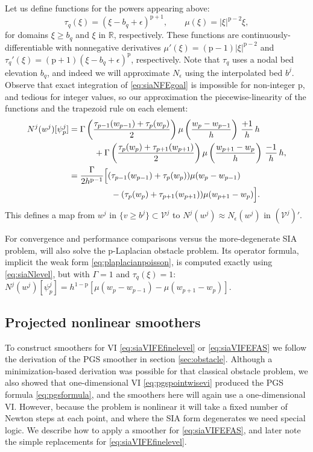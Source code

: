 \documentclass[letterpaper,final,12pt,reqno]{amsart}
\theoremstyle{claim}
\newcommand{\eps}{\epsilon}
\newcommand{\RR}{\mathbb{R}}
\newcommand{\pp}{{\text{p}}}
\numberwithin{equation}{section}
\numberwithin{figure}{section}
\numberwithin{table}{section}
\numberwithin{theorem}{section}
\begin{document}
Let us define functions for the powers appearing above:
\begin{equation}
\tau_q(\xi)  = (\xi - b_q + \eps)^{\pp+1}, \qquad \mu(\xi) = |\xi|^{\pp-2} \xi, \label{eq:siahelperfcns}
\end{equation}
for domains $\xi \ge b_q$ and $\xi$ in $\RR$, respectively.  These functions are continuously-differentiable with nonnegative derivatives $\mu'(\xi) = (\pp-1) |\xi|^{\pp-2}$ and $\tau_q'(\xi) = (\pp+1) (\xi-b_q + \eps)^{\pp}$, respectively.  Note that $\tau_q$ uses a nodal bed elevation $b_q$, and indeed we will approximate $N_\eps$ using the interpolated bed $b^j$.  Observe that exact integration of \eqref{eq:siaNFEgoal} is impossible for non-integer $\pp$, and tedious for integer values, so our approximation the piecewise-linearity of the functions and the trapezoid rule on each element:
\begin{align}
N^j(w^j)[\psi_p^j] &= \Gamma \left(\frac{\tau_{p-1}(w_{p-1}) + \tau_p(w_p)}{2}\right) \mu\left(\frac{w_p-w_{p-1}}{h}\right)\, \frac{+1}{h}\, h \notag \\
    &\qquad\quad  + \Gamma \left(\frac{\tau_p(w_p) + \tau_{p+1}(w_{p+1})}{2}\right) \mu\left(\frac{w_{p+1}-w_p}{h}\right)\, \frac{-1}{h}\, h, \notag \\
    &= \frac{\Gamma}{2h^{\pp-1}} \Big[(\tau_{p-1}(w_{p-1}) + \tau_p(w_p)) \mu(w_p-w_{p-1})  \label{eq:siaNlevel} \\
    &\qquad\qquad\quad - (\tau_p(w_p) + \tau_{p+1}(w_{p+1})) \mu(w_{p+1}-w_p)\Big]. \notag
\end{align}
This defines a map from $w^j$ in $\{v \ge b^j\} \subset \mathcal{V}^j$ to $N^j(w^j) \approx N_\eps(w^j)$ in $(\mathcal{V}^j)'$.

For convergence and performance comparisons versus the more-degenerate SIA problem, will also solve the $\pp$-Laplacian obstacle problem.  Its operator formula, implicit the weak form \eqref{eq:plaplacianpoisson}, is computed exactly using \eqref{eq:siaNlevel}, but with $\Gamma = 1$ and $\tau_q(\xi)=1$: $N^j(w^j)[\psi_p^j] = h^{1-\pp} \left[\mu(w_p-w_{p-1}) - \mu(w_{p+1}-w_p)\right]$.

\subsection{Projected nonlinear smoothers} \label{subsec:pngs}  To construct smoothers for VI \eqref{eq:siaVIFEfinelevel} or \eqref{eq:siaVIFEFAS} we follow the derivation of the PGS smoother in section \ref{sec:obstacle}.  Although a minimization-based derivation was possible for that classical obstacle problem, we also showed that one-dimensional VI \eqref{eq:pgspointwisevi} produced the PGS formula \eqref{eq:pgsformula}, and the smoothers here will again use a one-dimensional VI.  However, because the problem is nonlinear it will take a fixed number of Newton steps at each point, and where the SIA form degenerates we need special logic.  We describe how to apply a smoother for \eqref{eq:siaVIFEFAS}, and later note the simple replacements for \eqref{eq:siaVIFEfinelevel}.
\end{document}

